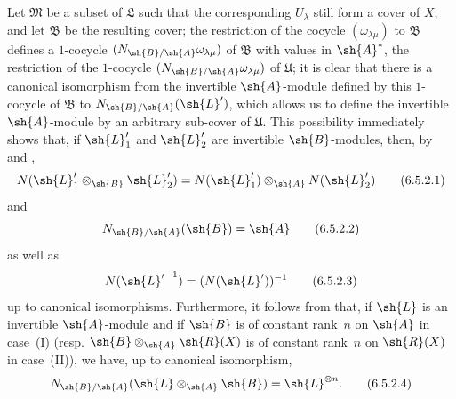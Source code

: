 \begin{env}[6.5.2]
Let $\mathfrak{M}$ be a subset of $\mathfrak{L}$ such that the corresponding $U_\lambda$ still form a cover of $X$, and let $\mathfrak{B}$ be the resulting cover;
the restriction of the cocycle $(\omega_{\lambda\mu})$ to $\mathfrak{B}$ defines a $1$-cocycle $(N_{\sh{B}/\sh{A}}\omega_{\lambda\mu})$ of $\mathfrak{B}$ with values in $\sh{A}^*$, the restriction of the $1$-cocycle $(N_{\sh{B}/\sh{A}}\omega_{\lambda\mu})$ of $\mathfrak{U}$;
it is clear that there is a canonical isomorphism from the invertible $\sh{A}$-module defined by this $1$-cocycle of $\mathfrak{B}$ to $N_{\sh{B}/\sh{A}}(\sh{L}')$, which allows us to define the invertible $\sh{A}$-module by an arbitrary sub-cover of $\mathfrak{U}$.
This possibility immediately shows that, if $\sh{L}'_1$ and $\sh{L}'_2$ are invertible $\sh{B}$-modules, then, by  and ,
\[
\label{II.6.5.2.1}
  N(\sh{L}'_1\otimes_{\sh{B}}\sh{L}'_2) = N(\sh{L}'_1)\otimes_{\sh{A}}N(\sh{L}'_2)
\tag{6.5.2.1}
\]
and
\[
\label{II.6.5.2.2}
  N_{\sh{B}/\sh{A}}(\sh{B}) = \sh{A}
\tag{6.5.2.2}
\]
as well as
\[
\label{II.6.5.2.3}
  N({\sh{L}'}^{-1}) = (N(\sh{L}'))^{-1}
\tag{6.5.2.3}
\]
up to canonical isomorphisms.
Furthermore, it follows from  that, if $\sh{L}$ is an invertible $\sh{A}$-module and if $\sh{B}$ is of constant rank~$n$ on $\sh{A}$ in case~(I) (resp. $\sh{B}\otimes_{\sh{A}}\sh{R}(X)$ is of constant rank~$n$ on $\sh{R}(X)$ in case~(II)), we have, up to canonical isomorphism,
\[
\label{II.6.5.2.4}
  N_{\sh{B}/\sh{A}}(\sh{L}\otimes_{\sh{A}}\sh{B}) = \sh{L}^{\otimes n}.
\tag{6.5.2.4}
\]
\end{env}

